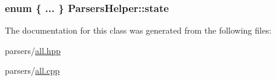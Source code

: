 \hypertarget{class_parsers_helper_a268b5522cce719a0c28d3e48d9b5cc04}{}
\subsubsection[{state}]{\setlength{\rightskip}{0pt plus 5cm}enum \{ ... \}   Parsers\+Helper\+::state\hspace{0.3cm}{\ttfamily [private]}}\label{class_parsers_helper_a268b5522cce719a0c28d3e48d9b5cc04}


The documentation for this class was generated from the following files\+:\begin{DoxyCompactItemize}
\item 
parsers/\hyperlink{parsers_2all_8hpp}{all.\+hpp}\item 
parsers/\hyperlink{parsers_2all_8cpp}{all.\+cpp}\end{DoxyCompactItemize}
